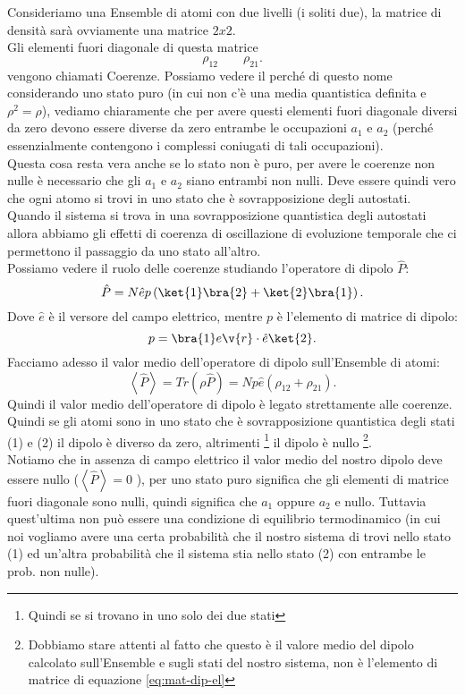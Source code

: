 Consideriamo una Ensemble di atomi con due livelli (i soliti due), la matrice di densità sarà ovviamente una matrice $2x 2$. \\
Gli elementi fuori diagonale di questa matrice
\[
\rho_{12} \quad \quad \rho_{21}
.\]
vengono chiamati Coerenze. Possiamo vedere il perché di questo nome considerando uno stato puro (in cui non c'è una media quantistica definita e $\rho^2=\rho$), vediamo chiaramente che per avere questi elementi fuori diagonale diversi da zero devono essere diverse da zero entrambe le occupazioni $a_1$ e $a_2$ (perché essenzialmente contengono i complessi coniugati di tali occupazioni).\\
Questa cosa resta vera anche se lo stato non è puro, per avere le coerenze non nulle è necessario che gli $a_1$ e $a_2$ siano entrambi non nulli. Deve essere quindi vero che ogni atomo si trovi in uno stato che è sovrapposizione degli autostati. \\
Quando il sistema si trova in una sovrapposizione quantistica degli autostati allora abbiamo gli effetti di coerenza di oscillazione di evoluzione temporale che ci permettono il passaggio da uno stato all'altro. \\
Possiamo vedere il ruolo delle coerenze studiando l'operatore di dipolo $\hat{P}$:
\[
    \hat{P}= N\hat{e}p\left(\ket{1}\bra{2}+ \ket{2}\bra{1}\right)
.\]
Dove $\hat{e}$ è il versore del campo elettrico, mentre $p$ è l'elemento di matrice di dipolo:
\[
    p = \bra{1}e\v{r}\cdot \hat{e}\ket{2} \label{eq:mat-dip-el}
.\] 
Facciamo adesso il valor medio dell'operatore di dipolo sull'Ensemble di atomi:
\[
    \left<\hat{P}\right>= Tr\left(\rho\hat{P}\right) =
    Np\hat{e}\left(\rho_{12}+\rho_{21}\right)
.\] 
Quindi il valor medio dell'operatore di dipolo è legato strettamente alle coerenze. Quindi se gli atomi sono in uno stato che è sovrapposizione quantistica degli stati (1) e (2) il dipolo è diverso da zero, altrimenti
\footnote{Quindi se si trovano in uno solo dei due stati} il dipolo è nullo
\footnote{Dobbiamo stare attenti al fatto che questo è il valore medio del dipolo calcolato sull'Ensemble e sugli stati del nostro sistema, non è l'elemento di matrice di equazione \ref{eq:mat-dip-el}}.\\
Notiamo che in assenza di campo elettrico il valor medio del nostro dipolo deve essere nullo ($\left<\hat{P}\right>=0$ ), per uno stato puro significa che gli elementi di matrice fuori diagonale sono nulli, quindi significa che $a_1$  oppure $a_2$  e nullo. Tuttavia quest'ultima non può essere una condizione di equilibrio termodinamico (in cui noi vogliamo avere una certa probabilità che il nostro sistema di trovi nello stato (1) ed un'altra probabilità che il sistema stia nello stato (2) con entrambe le prob. non nulle).\\
